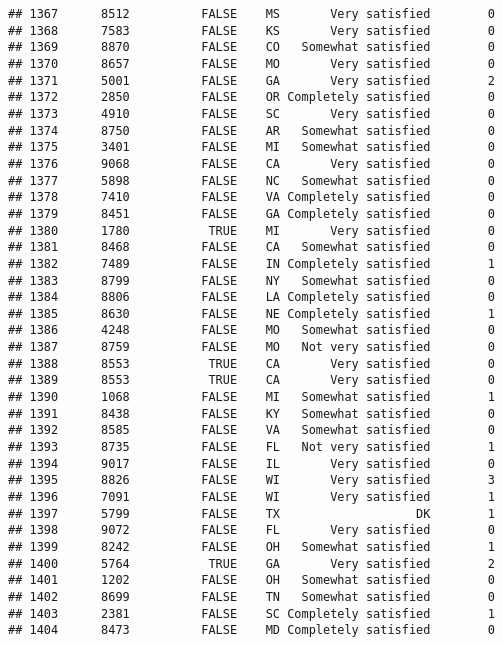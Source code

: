 \documentclass[]{book}
\theoremstyle{definition}
\theoremstyle{definition}
\theoremstyle{remark}
\begin{document}
\begin{verbatim}
## 1367      8512          FALSE    MS       Very satisfied        0
## 1368      7583          FALSE    KS       Very satisfied        0
## 1369      8870          FALSE    CO   Somewhat satisfied        0
## 1370      8657          FALSE    MO       Very satisfied        0
## 1371      5001          FALSE    GA       Very satisfied        2
## 1372      2850          FALSE    OR Completely satisfied        0
## 1373      4910          FALSE    SC       Very satisfied        0
## 1374      8750          FALSE    AR   Somewhat satisfied        0
## 1375      3401          FALSE    MI   Somewhat satisfied        0
## 1376      9068          FALSE    CA       Very satisfied        0
## 1377      5898          FALSE    NC   Somewhat satisfied        0
## 1378      7410          FALSE    VA Completely satisfied        0
## 1379      8451          FALSE    GA Completely satisfied        0
## 1380      1780           TRUE    MI       Very satisfied        0
## 1381      8468          FALSE    CA   Somewhat satisfied        0
## 1382      7489          FALSE    IN Completely satisfied        1
## 1383      8799          FALSE    NY   Somewhat satisfied        0
## 1384      8806          FALSE    LA Completely satisfied        0
## 1385      8630          FALSE    NE Completely satisfied        1
## 1386      4248          FALSE    MO   Somewhat satisfied        0
## 1387      8759          FALSE    MO   Not very satisfied        0
## 1388      8553           TRUE    CA       Very satisfied        0
## 1389      8553           TRUE    CA       Very satisfied        0
## 1390      1068          FALSE    MI   Somewhat satisfied        1
## 1391      8438          FALSE    KY   Somewhat satisfied        0
## 1392      8585          FALSE    VA   Somewhat satisfied        0
## 1393      8735          FALSE    FL   Not very satisfied        1
## 1394      9017          FALSE    IL       Very satisfied        0
## 1395      8826          FALSE    WI       Very satisfied        3
## 1396      7091          FALSE    WI       Very satisfied        1
## 1397      5799          FALSE    TX                   DK        1
## 1398      9072          FALSE    FL       Very satisfied        0
## 1399      8242          FALSE    OH   Somewhat satisfied        1
## 1400      5764           TRUE    GA       Very satisfied        2
## 1401      1202          FALSE    OH   Somewhat satisfied        0
## 1402      8699          FALSE    TN   Somewhat satisfied        0
## 1403      2381          FALSE    SC Completely satisfied        1
## 1404      8473          FALSE    MD Completely satisfied        0

\end{verbatim}
\end{document}

